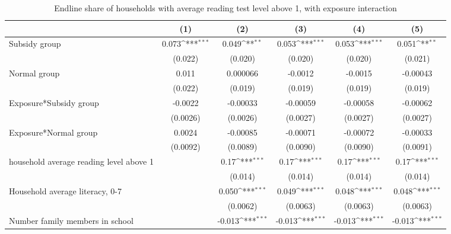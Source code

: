 \begin{table}[htbp]\centering
\def\sym#1{\ifmmode^{#1}\else\(^{#1}\)\fi}
\caption{Endline share of households with average reading test level above 1, with exposure interaction}
\begin{tabular*}{1\hsize}{@{\hskip\tabcolsep\extracolsep\fill}l*{5}{c}}
\toprule
                &\multicolumn{1}{c}{(1)}         &\multicolumn{1}{c}{(2)}         &\multicolumn{1}{c}{(3)}         &\multicolumn{1}{c}{(4)}         &\multicolumn{1}{c}{(5)}         \\
\midrule
Subsidy group   &    0.073\sym{***}&    0.049\sym{**} &    0.053\sym{***}&    0.053\sym{***}&    0.051\sym{**} \\
                &  (0.022)         &  (0.020)         &  (0.020)         &  (0.020)         &  (0.021)         \\
Normal group    &    0.011         & 0.000066         &  -0.0012         &  -0.0015         & -0.00043         \\
                &  (0.022)         &  (0.019)         &  (0.019)         &  (0.019)         &  (0.019)         \\
Exposure*Subsidy group&  -0.0022         & -0.00033         & -0.00059         & -0.00058         & -0.00062         \\
                & (0.0026)         & (0.0026)         & (0.0027)         & (0.0027)         & (0.0027)         \\
Exposure*Normal group&   0.0024         & -0.00085         & -0.00071         & -0.00072         & -0.00033         \\
                & (0.0092)         & (0.0089)         & (0.0090)         & (0.0090)         & (0.0091)         \\
household average reading level above 1&                  &     0.17\sym{***}&     0.17\sym{***}&     0.17\sym{***}&     0.17\sym{***}\\
                &                  &  (0.014)         &  (0.014)         &  (0.014)         &  (0.014)         \\
Household average literacy, 0-7&                  &    0.050\sym{***}&    0.049\sym{***}&    0.048\sym{***}&    0.048\sym{***}\\
                &                  & (0.0062)         & (0.0063)         & (0.0063)         & (0.0063)         \\
Number family members in school&                  &   -0.013\sym{***}&   -0.013\sym{***}&   -0.013\sym{***}&   -0.013\sym{***}\\

\end{tabular*}
\end{table}
